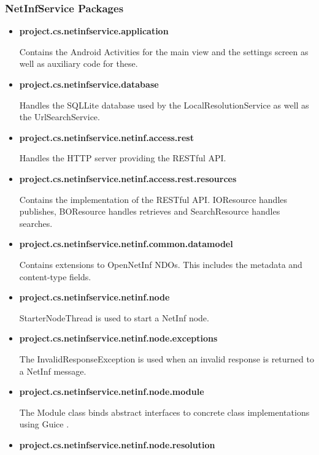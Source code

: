 \subsubsection{NetInfService Packages}

\begin{itemize}
	\item{\bf project.cs.netinfservice.application}
	
	Contains the Android Activities for the main view and the settings screen as well as auxiliary code for these.	
	
	\item{\bf project.cs.netinfservice.database}
	
	Handles the SQLLite database used by the LocalResolutionService as well as the UrlSearchService.	
	
	\item{\bf project.cs.netinfservice.netinf.access.rest}
	
	Handles the HTTP server providing the RESTful API.
	
	\item{\bf project.cs.netinfservice.netinf.access.rest.resources}	
	
	Contains the implementation of the RESTful API. IOResource handles publishes, BOResource handles retrieves and SearchResource handles searches.
	
	\item{\bf project.cs.netinfservice.netinf.common.datamodel}
	
	Contains extensions to OpenNetInf NDOs. This includes the metadata and content-type fields.
	
	\item{\bf project.cs.netinfservice.netinf.node}
	
	StarterNodeThread is used to start a NetInf node.	

	\item{\bf project.cs.netinfservice.netinf.node.exceptions}

	The InvalidResponseException is used when an invalid response is returned to a NetInf message.
	
	\item{\bf project.cs.netinfservice.netinf.node.module}
	
	The Module class binds abstract interfaces to concrete class implementations using Guice \cite{guice}.
	
	\item{\bf project.cs.netinfservice.netinf.node.resolution}
	

\end{itemize}
